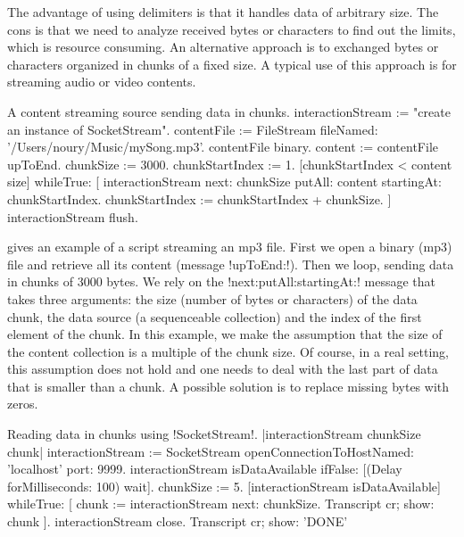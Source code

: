 \documentclass[a4paper,10pt,twoside]{book}
\begin{document}


The advantage of using delimiters is that it handles data of arbitrary size.
The cons is that we need to analyze received bytes or characters to find out the limits, which is resource consuming.
An alternative approach is to exchanged bytes or characters organized in chunks of a fixed size.
A typical use of this approach is for streaming audio or video contents.

\begin{script}{A content streaming source sending data in chunks.}
interactionStream := "create an instance of SocketStream". 
contentFile := FileStream fileNamed: '/Users/noury/Music/mySong.mp3'.
contentFile binary.
content := contentFile upToEnd.
chunkSize := 3000.
chunkStartIndex := 1.
[chunkStartIndex < content size] whileTrue: [
	interactionStream next: chunkSize putAll: content startingAt: chunkStartIndex.
	chunkStartIndex := chunkStartIndex + chunkSize.
]
interactionStream flush.
\end{script}

 gives an example of a script streaming an mp3 file.
First we open a binary (mp3) file and retrieve all its content (message \ct!upToEnd:!).
Then we loop, sending data in chunks of 3000 bytes.
We rely on the \ct!next:putAll:startingAt:! message that takes three arguments: the size (number of bytes or characters) of the data chunk,
the data source (a sequenceable collection) and the index of the first element of the chunk.
In this example, we make the assumption that the size of the content collection is a multiple of the chunk size.
Of course, in a real setting, this assumption does not hold and one needs to deal with the last part of data that is smaller than a chunk.
A possible solution is to replace missing bytes with zeros.

\begin{script}{Reading data in chunks using \ct!SocketStream!.}
	|interactionStream chunkSize chunk|
	interactionStream := SocketStream 
											openConnectionToHostNamed: 'localhost' port: 9999.
	interactionStream isDataAvailable ifFalse: [(Delay forMilliseconds: 100) wait].
	chunkSize := 5.
	[interactionStream isDataAvailable] whileTrue: [
		chunk  :=  interactionStream next: chunkSize.
		Transcript cr; show: chunk
	].
	interactionStream close.
	Transcript cr; show: 'DONE'
\end{script}
\end{document}
